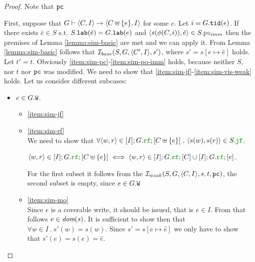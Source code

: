 \documentclass[12pt]{article}
\begin{document}
\begin{proof}
  Note that ${\mathtt{pc}}$ 
  
  First, suppose that 
  $G \vdash \langle C, I \rangle \rightarrow \langle C \uplus \{e\}, I \rangle$ for some $e$.
  Let $i = G.{\mathtt{tid}}(e)$.
  If there exists $\hat{e} \in S$ s.t. $S.{\mathtt{lab}}(\hat{e}) = G.{\mathtt{lab}}(e)$ and 
  $\tup{s(\front(C, i)), \hat{e}} \in S.\lPO_{imm}$
  then the premises of Lemma \ref{lemma:sim-basic} are met and we can apply it.
  From Lemma \ref{lemma:sim-basic} follows that $\mathcal{I}_{base}(S, G, \langle C', I \rangle, s')$,
  where $s' = s[e \mapsto \hat{e}]$ holds.
  Let $t' = t$.
  Obviously \ref{item:sim-pc}-\ref{item:sim-po-imm} holds,
  because neither $S$, nor $t$ nor ${\mathtt{pc}}$ was modified. 
  We need to show that \ref{item:sim-jf}-\ref{item:sim-vis-weak} holds.
  Let us consider different subcases:
  \begin{itemize}
  \item $e \in G.{\mathtt{W}}$.
    \begin{itemize}

    \item \ref{item:sim-jf} \\

    \item \ref{item:sim-rf} \\
      We need to show that
      $\forall{\tup{w, r} \in [\lI];\lG.\lRF;[\lC \uplus\{e\}]} ~.~
      \tup{s(w), s(r)} \in \lES.\lJF
      $.
      
      $\tup{w, r} \in [\lI];\lG.\lRF;[\lC \uplus\{e\}] \iff
      \tup{w, r} \in [\lI];\lG.\lRF;[\lC] \cup  [\lI];\lG.\lRF;[e]
      $.
      
      For the first subset it follows from the $\mathcal{I}_{weak}(S, G, \langle C, I \rangle, s, t, {\mathtt{pc}})$,
      the second subset is empty, since $e \in G.{\mathtt{W}}$

    \item \ref{item:sim-mo} \\
      Since $e$ is a coverable write, it should be issued, that is $e \in I$.
      From that follows $e \in \textit{dom}{({s})}$.
      It is sufficient to show then that $\forall{w \in I} ~.~ s'(w) = s(w)$.
      Since $s' = s[e \mapsto \hat{e}]$ we only have to show that $s'(e) = s(e) = \hat{e}$.
      
      
      
      


\end{itemize}
\end{itemize}
\end{proof}
\end{document}
